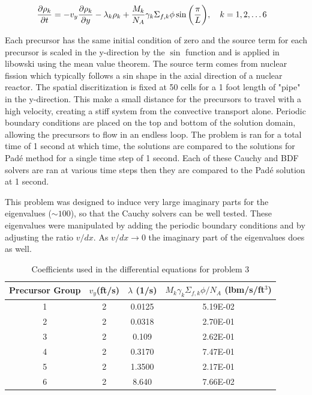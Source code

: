 \begin{equation}
\setlength{\jot}{15pt}
\begin{split}
    \frac{\partial \rho_{k}}{\partial t} = -v_{y}\frac{\partial \rho_{k}}{\partial y} - \lambda_{k}\rho_{k}& + \frac{M_{k}}{N_{A}}\gamma_{k}\Sigma_{f,k}\phi\sin\bigg(\frac{\pi}{L}\bigg), \quad k = 1, 2, \ldots 6
\end{split}
\label{eq:problem3}
\end{equation}

\noindent Each precursor has the same initial condition of zero and the source term for each precursor is scaled in the y-direction by the $\sin$ function and is applied in libowski using the mean value theorem. The source term comes from nuclear fission which typically follows a sin shape in the axial direction of a nuclear reactor. The spatial discritization is fixed at 50 cells for a 1 foot length of "pipe" in the y-direction. This make a small distance for the precursors to travel with a high velocity, creating a stiff system from the convective transport alone. Periodic boundary conditions are placed on the top and bottom of the solution domain, allowing the precursors to flow in an endless loop. The problem is ran for a total time of 1 second at which time, the solutions are compared to the solutions for Pad\'e method for a single time step of 1 second. Each of these Cauchy and BDF solvers are ran at various time steps then they are compared to the Pad\'e solution at 1 second. 

This problem was designed to induce very large imaginary parts for the eigenvalues ($\sim 100$), so that the Cauchy solvers can be well tested. These eigenvalues were manipulated by adding the periodic boundary conditions and by adjusting the ratio $v/dx$. As $v/dx \xrightarrow{} 0$ the imaginary part of the eigenvalues does as well.  


\begin{table}[b]
    \caption{\label{tab:problem3Coeffs} Coefficients used in the differential equations for problem 3}
    \centering
    \begin{tabular}{c|c|c|c}
    \hline
    Precursor Group & $v_{y}$(ft/s) &$\lambda $ (1/s) & $M_{k}\gamma_{k}\Sigma_{f,k}\phi/N_{A}$ (lbm/s/ft$^{3}$) \\
    \hline
    \hline
    1 & 2 & 0.0125 & 5.19E-02  \\  
    \hline
    2 & 2 & 0.0318 & 2.70E-01 \\  
    \hline
    3 & 2 & 0.109 & 2.62E-01 \\  
    \hline
    4 & 2 & 0.3170 & 7.47E-01 \\  
    \hline
    5 & 2 & 1.3500 & 2.17E-01 \\  
    \hline
    6 & 2 & 8.640  & 7.66E-02 \\  
    \hline
    \end{tabular}
\end{table}

